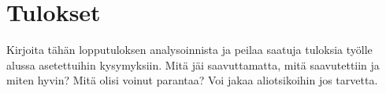 \chapter{Tulokset}
\label{ch:tulokset}
Kirjoita tähän lopputuloksen analysoinnista ja peilaa saatuja tuloksia työlle alussa asetettuihin kysymyksiin. Mitä jäi saavuttamatta, mitä saavutettiin ja miten hyvin? Mitä olisi voinut parantaa? Voi jakaa aliotsikoihin jos tarvetta.